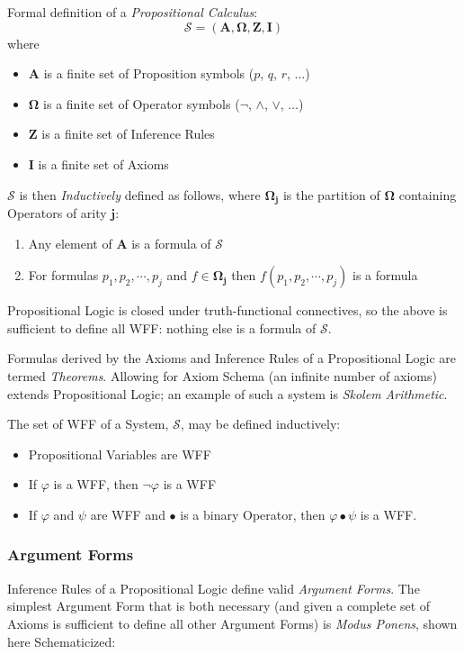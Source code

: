 \documentclass{article}
\begin{document}
Formal definition of a \emph{Propositional Calculus}:
\[
    \mathcal{S} = (\mathbf{A},\mathbf{\Omega},\mathbf{Z},\mathbf{I})
\]
where
\begin{itemize}
\item $\mathbf{A}$ is a finite set of Proposition symbols ($p$, $q$,
  $r$, $\ldots$)
\item $\mathbf{\Omega}$ is a finite set of Operator symbols ($\neg$,
  $\wedge$, $\vee$, $\ldots$)
\item $\mathbf{Z}$ is a finite set of Inference Rules
\item $\mathbf{I}$ is a finite set of Axioms
\end{itemize}
$\mathcal{S}$ is then \emph{Inductively} defined as follows, where
$\mathbf{\Omega_j}$ is the partition of $\mathbf{\Omega}$ containing
Operators of arity $\mathbf{j}$:
\begin{enumerate}
\item Any element of $\mathbf{A}$ is a formula of $\mathcal{S}$
\item For formulas $p_1, p_2, \cdots, p_j$ and $f \in
  \mathbf{\Omega_j}$ then $f(p_1, p_2, \cdots, p_j)$ is a formula
\end{enumerate}
Propositional Logic is closed under truth-functional connectives, so
the above is sufficient to define all WFF: nothing else is a formula
of $\mathcal{S}$.

Formulas derived by the Axioms and Inference Rules of a Propositional
Logic are termed \emph{Theorems}. Allowing for Axiom Schema (an
infinite number of axioms) extends Propositional Logic; an example of
such a system is \emph{Skolem Arithmetic}\cite{skolem23}.

The set of WFF of a System, $\mathcal{S}$, may be defined inductively:
\begin{itemize}
\item Propositional Variables are WFF
\item If $\varphi$ is a WFF, then $\neg\varphi$ is a WFF
\item If $\varphi$ and $\psi$ are WFF and $\bullet$ is a binary Operator,
  then $\varphi \bullet \psi$ is a WFF.
\end{itemize}

\subsubsection{Argument Forms}

Inference Rules of a Propositional Logic define valid \emph{Argument
  Forms}. The simplest Argument Form that is both necessary (and given
a complete set of Axioms is sufficient to define all other Argument
Forms) is \emph{Modus Ponens}, shown here Schematicized:
\end{document}
